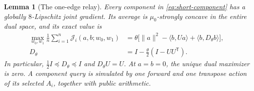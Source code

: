 \documentclass[11pt,letterpaper]{article}
\newtheorem{lemma}[theorem]{Lemma}
\theoremstyle{definition}
\theoremstyle{remark}
\begin{document}
\begin{lemma}[The one-edge relay]
\label{lem:short-relay}
Every component in \eqref{eq:short-component} has a globally
$8$-Lipschitz joint gradient.  Its average is $\mu_0$-strongly concave
in the entire dual space, and its exact value is
\begin{equation}
\begin{split}
 \max_{w_0,w_1}\frac1n\sum_{i=1}^n
             \mathcal J_i(a,b;w_0,w_1)
 &=\theta\bigl[\|a\|^2-\langle b,Ua\rangle
                         +\langle b,D_\theta b\rangle\bigr],\\
 D_\theta&=I-\frac\theta2(I-UU^{\mathsf T}).
\end{split}
\label{eq:short-endpoint-energy}
\end{equation}
In particular, $\tfrac12I\preceq D_\theta\preceq I$ and
$D_\theta U=U$.  At $a=b=0$, the unique dual maximizer is zero.
A component query is simulated by one forward and one transpose action
of its selected $A_i$, together with public arithmetic.
\end{lemma}
\end{document}
